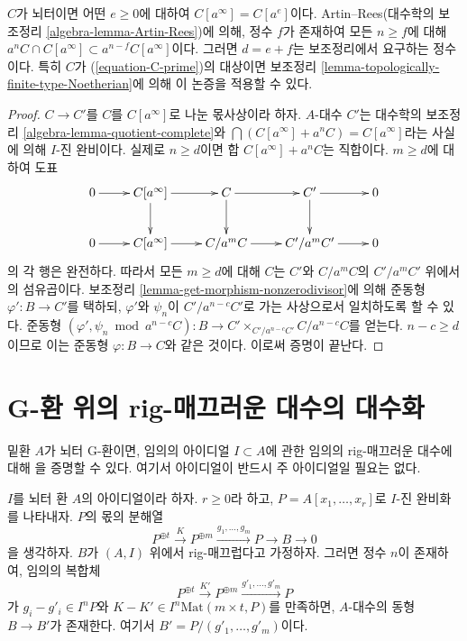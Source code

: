 \noindent
$C$가 뇌터이면 어떤 $e \geq 0$에 대하여 $C[a^\infty] = C[a^e]$이다.
Artin--Rees(대수학의 보조정리 \ref{algebra-lemma-Artin-Rees})에 의해,
정수 $f$가 존재하여 모든 $n \geq f$에 대해
$a^nC \cap C[a^\infty] \subset a^{n - f}C[a^\infty]$이다.
그러면 $d = e + f$는 보조정리에서 요구하는 정수이다.
특히 $C$가 (\ref{equation-C-prime})의 대상이면 보조정리
\ref{lemma-topologically-finite-type-Noetherian}에 의해 이 논증을 적용할 수 있다.

\begin{proof}
$C \to C'$를 $C$를 $C[a^\infty]$로 나눈 몫사상이라 하자.
$A$-대수 $C'$는 대수학의 보조정리 \ref{algebra-lemma-quotient-complete}와
$\bigcap (C[a^\infty] + a^nC) = C[a^\infty]$라는 사실에 의해 $I$-진 완비이다.
실제로 $n \geq d$이면 합 $C[a^\infty] + a^nC$는 직합이다.
$m \geq d$에 대하여 도표
$$
\xymatrix{
0 \ar[r] &
C[a^\infty] \ar[r] \ar[d] &
C \ar[r] \ar[d] & C' \ar[r] \ar[d] & 0 \\
0 \ar[r] &
C[a^\infty] \ar[r] &
C/a^m C \ar[r] & C'/a^m C' \ar[r] & 0
}
$$
의 각 행은 완전하다. 따라서 모든 $m \geq d$에 대해
$C$는 $C'$와 $C/a^mC$의 $C'/a^mC'$ 위에서의 섬유곱이다.
보조정리 \ref{lemma-get-morphism-nonzerodivisor}에 의해 준동형
$\varphi' : B \to C'$를 택하되, $\varphi'$와 $\psi_n$이
$C'/a^{n - c}C'$로 가는 사상으로서 일치하도록 할 수 있다.
준동형 $(\varphi', \psi_n \bmod a^{n - c}C) : B \to
C' \times_{C'/a^{n - c}C'} C/a^{n - c}C$를 얻는다.
$n - c \geq d$이므로 이는 준동형 $\varphi : B \to C$와 같은 것이다.
이로써 증명이 끝난다.
\end{proof}


\section{G-환 위의 rig-매끄러운 대수의 대수화}
\label{section-over-G-ring}

\noindent
밑환 $A$가 뇌터 G-환이면, 임의의 아이디얼 $I \subset A$에 관한 임의의
rig-매끄러운 대수에 대해 \cite[III Theorem 7]{Elkik}을 증명할 수 있다.
여기서 아이디얼이 반드시 주 아이디얼일 필요는 없다.

\begin{lemma}
\label{lemma-close-enough}
$I$를 뇌터 환 $A$의 아이디얼이라 하자. $r \geq 0$라 하고,
$P = A[x_1, \ldots, x_r]$로 $I$-진 완비화를 나타내자.
$P$의 몫의 분해열
$$
P^{\oplus t} \xrightarrow{K} P^{\oplus m}
\xrightarrow{g_1, \ldots, g_m} P \to B \to 0
$$
을 생각하자. $B$가 $(A, I)$ 위에서 rig-매끄럽다고 가정하자.
그러면 정수 $n$이 존재하여, 임의의 복합체
$$
P^{\oplus t} \xrightarrow{K'} P^{\oplus m}
\xrightarrow{g'_1, \ldots, g'_m} P
$$
가 $g_i - g'_i \in I^nP$와 $K - K' \in I^n\text{Mat}(m \times t, P)$를 만족하면,
$A$-대수의 동형 $B \to B'$가 존재한다. 여기서 $B' = P/(g'_1, \ldots, g'_m)$이다.
\end{lemma}


